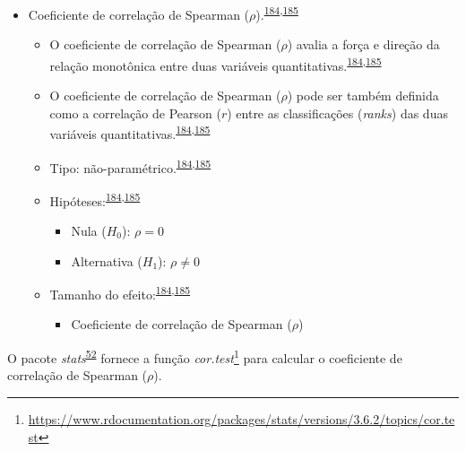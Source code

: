 \documentclass[
  a4paper,
]{book}
\providecommand{\tightlist}{%
  \setlength{\itemsep}{0pt}\setlength{\parskip}{0pt}}
\renewcommand{\href}[2]{#2\footnote{\url{#1}}}
\newenvironment{infobox}[1]
  {
  \begin{itemize}
  \renewcommand{\labelitemi}{
    \raisebox{-.7\height}[0pt][0pt]{
      {\setkeys{Gin}{width=3em,keepaspectratio}
        \texttt{[image: \#1]}}
    }
  }
  \setlength{\fboxsep}{1em}
  \begin{blackbox}
  \item
  }
  {
  \end{blackbox}
  \end{itemize}
  }
\begin{document}
\begin{itemize}
\item
  Coeficiente de correlação de Spearman (\(\rho\)).\textsuperscript{\protect\hyperlink{ref-khamis2008}{184},\protect\hyperlink{ref-allison2022}{185}}

  \begin{itemize}
  \item
    O coeficiente de correlação de Spearman (\(\rho\)) avalia a força e direção da relação monotônica entre duas variáveis quantitativas.\textsuperscript{\protect\hyperlink{ref-khamis2008}{184},\protect\hyperlink{ref-allison2022}{185}}
  \item
    O coeficiente de correlação de Spearman (\(\rho\)) pode ser também definida como a correlação de Pearson (\(r\)) entre as classificações (\emph{ranks}) das duas variáveis quantitativas.\textsuperscript{\protect\hyperlink{ref-khamis2008}{184},\protect\hyperlink{ref-allison2022}{185}}
  \item
    Tipo: não-paramétrico.\textsuperscript{\protect\hyperlink{ref-khamis2008}{184},\protect\hyperlink{ref-allison2022}{185}}
  \item
    Hipóteses:\textsuperscript{\protect\hyperlink{ref-khamis2008}{184},\protect\hyperlink{ref-allison2022}{185}}

    \begin{itemize}
    \item
      Nula (\(H_{0}\)): \(\rho=0\)
    \item
      Alternativa (\(H_{1}\)): \(\rho≠0\)
    \end{itemize}
  \item
    Tamanho do efeito:\textsuperscript{\protect\hyperlink{ref-khamis2008}{184},\protect\hyperlink{ref-allison2022}{185}}

    \begin{itemize}
    \tightlist
    \item
      Coeficiente de correlação de Spearman (\(\rho\))
    \end{itemize}
  \end{itemize}
\end{itemize}

\begin{infobox}{images/Rlogo}
O pacote \emph{stats}\textsuperscript{\protect\hyperlink{ref-stats-2}{52}} fornece a função \href{https://www.rdocumentation.org/packages/stats/versions/3.6.2/topics/cor.test}{\emph{cor.test}} para calcular o coeficiente de correlação de Spearman (\(\rho\)).

\end{infobox}
\end{document}

